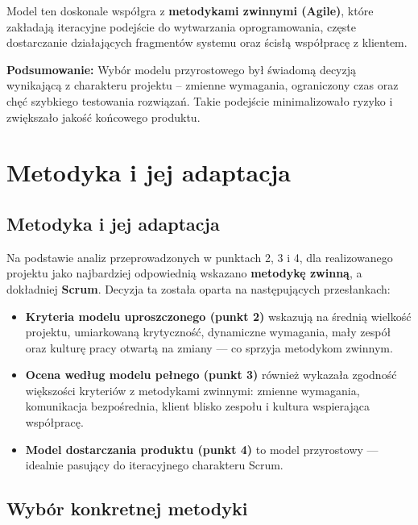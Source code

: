 \documentclass[12pt,a4paper,colorlinks=true,linkcolor=NavyBlue,citecolor=red,urlcolor=NavyBlue]{book}
\begin{document}
Model ten doskonale współgra z \textbf{metodykami zwinnymi (Agile)}, które zakładają iteracyjne podejście do wytwarzania oprogramowania, częste dostarczanie działających fragmentów systemu oraz ścisłą współpracę z klientem.

\noindent
\textbf{Podsumowanie:} Wybór modelu przyrostowego był świadomą decyzją wynikającą z charakteru projektu – zmienne wymagania, ograniczony czas oraz chęć szybkiego testowania rozwiązań. Takie podejście minimalizowało ryzyko i zwiększało jakość końcowego produktu.


\newpage
\thispagestyle{empty}
\null
\newpage


\chapter{Metodyka i jej adaptacja}

\section{Metodyka i jej adaptacja}

Na podstawie analiz przeprowadzonych w punktach 2, 3 i 4, dla realizowanego projektu jako najbardziej odpowiednią wskazano \textbf{metodykę zwinną}, a dokładniej \textbf{Scrum}. Decyzja ta została oparta na następujących przesłankach:

\begin{itemize}
  \item \textbf{Kryteria modelu uproszczonego (punkt 2)} wskazują na średnią wielkość projektu, umiarkowaną krytyczność, dynamiczne wymagania, mały zespół oraz kulturę pracy otwartą na zmiany — co sprzyja metodykom zwinnym.
  \item \textbf{Ocena według modelu pełnego (punkt 3)} również wykazała zgodność większości kryteriów z metodykami zwinnymi: zmienne wymagania, komunikacja bezpośrednia, klient blisko zespołu i kultura wspierająca współpracę.
  \item \textbf{Model dostarczania produktu (punkt 4)} to model przyrostowy — idealnie pasujący do iteracyjnego charakteru Scrum.
\end{itemize}

\section{Wybór konkretnej metodyki}
\end{document}
